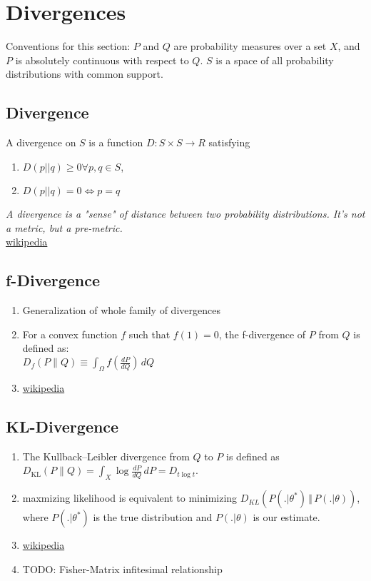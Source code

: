 \section{Divergences}
Conventions for this section: $P$ and $Q$ are probability measures over a set $X$, and $P$ is absolutely continuous with respect to $Q$. $S$ is a space of all probability distributions with common support.
\subsection{Divergence}
A divergence on $S$ is a function $D: S \times S \rightarrow R$ satisfying
\begin{enumerate}
	\item $D(p || q) \geq 0  \forall p, q \in S$,
	\item $D(p || q) = 0 \Leftrightarrow p = q$
\end{enumerate}
\textit{A divergence is a "sense" of distance between two probability distributions. It's not a metric, but a pre-metric.}\\
\href{https://en.wikipedia.org/wiki/Divergence_(statistics)}{wikipedia}

\subsection{f-Divergence}
\begin{enumerate}
	\item Generalization of whole family of divergences
	\item For a convex function $f$ such that $f(1) = 0$, the f-divergence of $P$ from $Q$ is defined as:\\
	$D_{f}(P\parallel Q)\equiv \int _{{\Omega }}f\left({\frac{dP}{dQ}}\right)\,dQ$
	\item \href{https://en.wikipedia.org/wiki/Divergence_(statistics)}{wikipedia}
\end{enumerate}

\subsection{KL-Divergence}
\begin{enumerate}
	\item The Kullback–Leibler divergence from $Q$ to $P$ is defined as\\
	$D_{\mathrm {KL} }(P\|Q)=\int _{X}\log {\frac {dP}{dQ}}\,dP=D_{t\log t}$.
	\item maxmizing likelihood is equivalent to minimizing $D_{KL}(P(. \vert \theta^{\ast}) \, \Vert \, P(. \vert \theta))$, where $P(. \vert \theta^{\ast})$ is the true distribution and $P(. \vert \theta)$ is our estimate.
	\item \href{https://en.wikipedia.org/wiki/Kullback–Leibler_divergence}{wikipedia}
	\item TODO: Fisher-Matrix infitesimal relationship
\end{enumerate}

